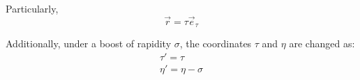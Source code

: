 Particularly,
\begin{equation}
	\vec{r} = \tau \vec{e}_\tau
\end{equation}

\color{purple}
Additionally, under a boost of rapidity $\sigma$, the coordinates $\tau$ and $\eta$ are changed as:
\begin{subequations}
\begin{gather}
	\tau' = \tau \\
	\eta' = \eta - \sigma
\end{gather}
\end{subequations}
\color{black}